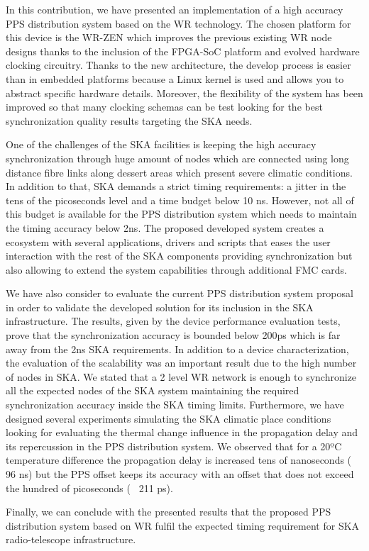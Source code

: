 In this contribution, we have presented an implementation of a high accuracy 
PPS distribution system based on the WR technology. The chosen platform for 
this device is the WR-ZEN which improves the previous existing WR node designs 
thanks to the inclusion of the FPGA-SoC platform and evolved hardware clocking 
circuitry. Thanks to the new architecture, the develop process is easier than 
in embedded platforms because a Linux kernel is used and allows you to abstract 
specific hardware details. Moreover, the flexibility of the system has been 
improved so that many clocking schemas can be test looking for the best 
synchronization quality results targeting the SKA needs.

One of the challenges of the SKA facilities is keeping the high accuracy 
synchronization through huge amount of nodes which are connected using long 
distance fibre links along dessert areas which present severe climatic 
conditions. In addition to that, SKA demands a strict timing requirements: a 
jitter in the tens of the picoseconds level and a time budget below 10 ns. 
However, not all of this budget is available for the PPS distribution system 
which needs to maintain the timing accuracy below 2ns. The proposed developed 
system creates a ecosystem with several applications, drivers and scripts that 
eases the user interaction with the rest of the 
SKA components providing synchronization but also allowing to extend the system 
capabilities through additional FMC cards.

We have also consider to evaluate the current PPS distribution system proposal 
in order to validate the developed solution for its inclusion in the SKA 
infrastructure. The results, given by the device performance evaluation tests, 
prove that the synchronization accuracy is bounded below 200ps which is far 
away from the 2ns SKA requirements. In addition to a device characterization, 
the evaluation of the scalability was an important result due to the high 
number of nodes in SKA. We stated that a 2 level WR network is enough to 
synchronize all the expected nodes of the SKA system maintaining the required 
synchronization accuracy inside the SKA timing limits. Furthermore, we have 
designed several experiments simulating the SKA climatic place conditions 
looking for evaluating the thermal change influence in the propagation delay 
and its repercussion in the PPS distribution system. We observed that for a 
20ºC temperature difference the propagation delay is increased tens of 
nanoseconds (~ 96 ns) but the PPS offset keeps its accuracy with an offset that 
does not exceed the hundred of picoseconds (~ 211 ps). 

Finally, we can conclude with the presented results that the proposed PPS 
distribution system based on WR fulfil the expected timing requirement for SKA 
radio-telescope infrastructure.
